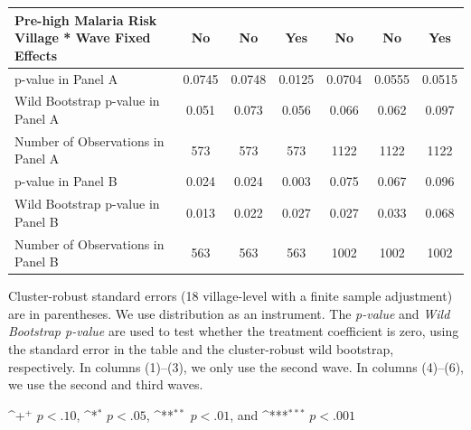 \documentclass[fleqn,11pt]{article}
\newcommand{\sym}[1]{\rlap{$#1$}}
\def\sym#1{\ifmmode^{#1}\else\(^{#1}\)\fi
}
\begin{document}
\begin{table}[h]
\begin{adjustbox}{max width=\textwidth}
\begin{threeparttable}
\begin{tabular}{l*{6}{c}}
Pre-high Malaria Risk Village * Wave Fixed Effects &          No         &          No         &         Yes         &          No         &          No         &         Yes         \\
\hline
p-value in Panel A            &      0.0745         &      0.0748         &      0.0125         &      0.0704         &      0.0555         &      0.0515      \\
Wild Bootstrap p-value in Panel A&       0.051         &       0.073         &       0.056         &       0.066         &       0.062         &       0.097     \\
Number of Observations in Panel A       &         573         &         573         &      573         &        1122  &    1122         &        1122         \\
p-value  in Panel B &       0.024         &       0.024         &       0.003         &       0.075         &       0.067         &       0.096       \\
Wild Bootstrap p-value  in Panel B            &      0.013         &       0.022         &       0.027         &       0.027         &       0.033         &       0.068         \\
Number of Observations in Panel B       &          563         &         563         &         563         &        1002         &        1002         &        1002            \\
\hline\hline
\end{tabular}
\begin{tablenotes}
\item Cluster-robust standard errors (18 village-level with a finite sample adjustment) are in parentheses. We use distribution as an instrument. The \textit{p-value} and \textit{Wild Bootstrap p-value} are used to test whether the treatment coefficient is zero, using the standard error in the table and the cluster-robust wild bootstrap, respectively. In columns (1)--(3), we only use the second wave. In columns (4)--(6), we use the second and third waves.
\item \sym{+} \(p<.10\), \sym{*} \(p<.05\), \sym{**} \(p<.01\), and \sym{***} \(p<.001\) 
\end{tablenotes}
\end{threeparttable}
\end{adjustbox}
\end{table}
\end{document}

